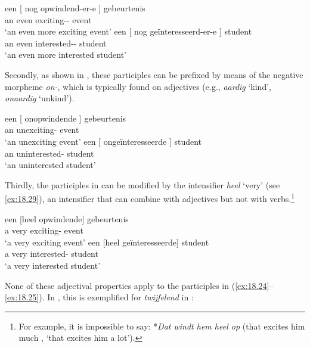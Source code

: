 \documentclass[output=paper]{langsci/langscibook}
\begin{document}
\ea%
    \label{ex:18.27}
	\ea
	\gll  een [ nog    opwindend-er-e ]            gebeurtenis\\
    an {} even    exciting-\Cmpr-\Agr{} {} event\\
	\glt ‘an even more exciting event’
	\ex
	\gll  een  [ nog  geïnteresseerd-er-e ]        student\\
    an {} even  interested-\Cmpr-\Agr{} {}  student\\
	\glt ‘an even more interested student’
	\z
\z

Secondly, as shown in , these participles can be prefixed by
means of the negative morpheme \emph{on-}, which is typically found on
adjectives (e.g., \emph{aardig} \enquote*{kind}, \emph{onaardig}
\enquote*{unkind}).

\ea%
    \label{ex:18.28}
	\ea
	\gll  een [ onopwindende ]  gebeurtenis\\
    an {} unexciting-\Agr{} {}   event\\
	\glt ‘an unexciting event’
	\ex
	\gll  een [ ongeïnteresseerde ]  student\\
    an {} uninterested-\Agr{} {}   student\\
	\glt ‘an uninterested student’
	\z
\z

Thirdly, the participles in  can be modified by the intensifier
\emph{heel} ‘very’ (see \ref{ex:18.29}), an intensifier that can combine with
adjectives but not with verbs.\footnote{For example, it is impossible to say:
*\emph{Dat windt hem heel op} (that excites him much \Ptcl{},
\enquote*{that excites him a lot}).}

\ea%
    \label{ex:18.29}
	\ea
	\gll een    [heel  opwindende]  gebeurtenis\\
		 a        very    exciting-\Agr{}  event\\
	\glt ‘a very exciting event’
	\ex
	\gll  een    [heel  geïnteresseerde]  student\\
		a        very    interested-\Agr{}      student\\
	\glt ‘a very interested student’
	\z
\z

None of these adjectival properties apply to the participles in
(\ref{ex:18.24}--\ref{ex:18.25}). In , this is exemplified for
\emph{twijfelend} in :

\ea%
    \label{ex:18.30}
	\z
\z
\end{document}
